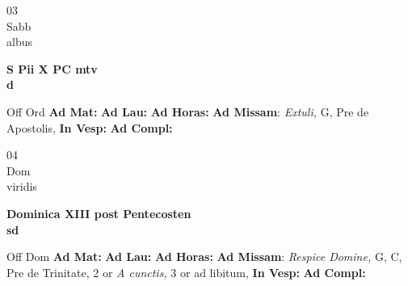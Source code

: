 \documentclass[10pt, openany]{book}
\begin{document}
        \begin{center}
            \begin{minipage}{3.5in}
                \vspace{2em}
                \begin{minipage}{0.5in}
                    {\Huge 03} \\
                    {\normalsize Sabb} \\
                    {\normalsize albus}
                \end{minipage}
                \begin{minipage}{3.0in}
                    \textbf{ \large S Pii X PC mtv \\
                    \textnormal{\normalsize d}} \\ 
                \end{minipage}
                \begin{justify}Off Ord
                    \textbf{Ad Mat: }
                    \textbf{Ad Lau: }
                    \textbf{Ad Horas: }\textbf{Ad Missam}: \textit{Extuli,} G, Pre de Apostolis,  
                    \textbf{In Vesp: }
                    \textbf{Ad Compl: }
                \end{justify}
            \end{minipage}
        \end{center}
    
        \begin{center}
            \begin{minipage}{3.5in}
                \vspace{2em}
                \begin{minipage}{0.5in}
                    {\Huge 04} \\
                    {\normalsize Dom} \\
                    {\normalsize viridis}
                \end{minipage}
                \begin{minipage}{3.0in}
                    \textbf{ \large Dominica XIII post Pentecosten \\
                    \textnormal{\normalsize sd}} \\ 
                \end{minipage}
                \begin{justify}Off Dom
                    \textbf{Ad Mat: }
                    \textbf{Ad Lau: }
                    \textbf{Ad Horas: }\textbf{Ad Missam}: \textit{Respice Domine,} G, C, Pre de Trinitate, 2 or \textit{A cunctis,} 3 or ad libitum,  
                    \textbf{In Vesp: }
                    \textbf{Ad Compl: }
                \end{justify}
            \end{minipage}
        \end{center}
    
\end{document}
